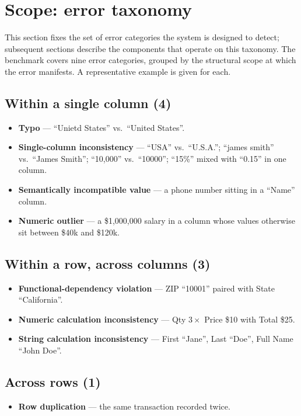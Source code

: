 \documentclass[11pt]{article}
\begin{document}
\section*{Scope: error taxonomy}
This section fixes the set of error categories the system is
designed to detect; subsequent sections describe the components
that operate on this taxonomy. The benchmark covers nine error
categories, grouped by the structural scope at which the error
manifests. A representative example is given for each.

\subsection*{Within a single column (4)}
\begin{itemize}
  \item \textbf{Typo} --- ``Unietd States'' vs.\ ``United States''.
  \item \textbf{Single-column inconsistency} --- ``USA'' vs.\
    ``U.S.A.''; ``james smith'' vs.\ ``James Smith'';
    ``10,000'' vs.\ ``10000''; ``15\%'' mixed with ``0.15''
    in one column.
  \item \textbf{Semantically incompatible value} --- a phone
    number sitting in a ``Name'' column.
  \item \textbf{Numeric outlier} --- a \$1,000,000 salary in a
    column whose values otherwise sit between \$40k and \$120k.
\end{itemize}

\subsection*{Within a row, across columns (3)}
\begin{itemize}
  \item \textbf{Functional-dependency violation} --- ZIP
    ``10001'' paired with State ``California''.
  \item \textbf{Numeric calculation inconsistency} ---
    Qty $3 \times$ Price \$10 with Total \$25.
  \item \textbf{String calculation inconsistency} --- First
    ``Jane'', Last ``Doe'', Full Name ``John Doe''.
\end{itemize}

\subsection*{Across rows (1)}
\begin{itemize}
  \item \textbf{Row duplication} --- the same transaction
    recorded twice.
\end{itemize}
\end{document}
